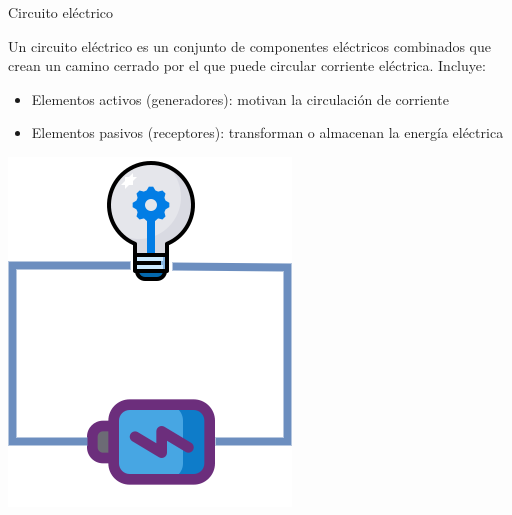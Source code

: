 \documentclass[aspectratio=169, xcolor={usenames,svgnames,dvipsnames}]{beamer}
\begin{document}
\begin{frame}{Circuito eléctrico}
\begin{minipage}[c]{0.58\linewidth}
    Un \alert{circuito eléctrico} es un conjunto de componentes eléctricos combinados que crean un camino cerrado por el que puede circular corriente eléctrica. Incluye: 
\begin{itemize}
\item \alert{Elementos activos} (generadores): motivan la circulación de corriente
\item \alert{Elementos pasivos} (receptores): transforman o almacenan la energía eléctrica
\end{itemize}
\end{minipage}
\hfill%
\begin{minipage}[c]{0.3\linewidth}
    \includegraphics[width=\linewidth]{../figs/circuito.png}
\end{minipage}

\end{frame}
\end{document}
